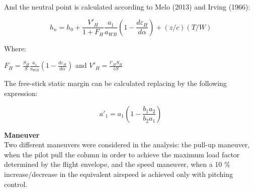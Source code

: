 And the neutral point is calculated according to Melo (2013) and Irving (1966):

\begin{equation}
    h_{n}=h_{0}+\frac{V'_{H}}{1+F_{H}}\frac{a_{1}}{a_{WB}}(1-\frac{d\varepsilon_{H}}{d\alpha})+(z/c)(T/W)
    \label{eq:X10}
\end{equation}

Where:

\begin{center}
$F_{H}=\frac{S_{H}}{S}\frac{a_{1}}{a_{WB}}(1-\frac{d\varepsilon_{H}}{d\alpha})$ and $V'_{H}=\frac{l'_{H} S_{H}}{\bar{c} S}$
\end{center}

The free-stick static margin can be calculated replacing by the following expression:

\begin{equation}
    a'_{1}=a_{1}(1-\frac{b_{1} a_{2}}{b_{2} a_{1}})
    \label{eq:X11}
\end{equation}

\textbf{Maneuver}
\\
Two different maneuvers were considered in the analysis: the pull-up maneuver, when the pilot pull the column in order to achieve the maximum load factor determined by the flight envelope, and the speed maneuver, when a 10 \% increase/decrease in the equivalent airspeed is achieved only with pitching control.

